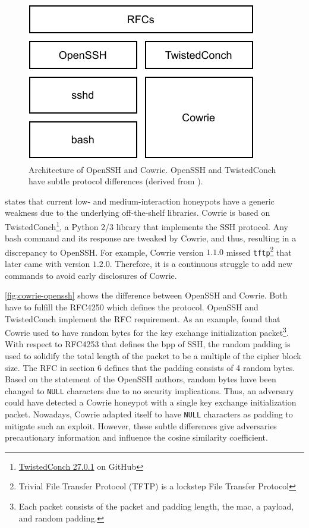 \begin{figure}
    \centering
    \includegraphics{figures/cowrie-openssh.pdf}
    \caption[Architecture of OpenSSH and Cowrie]{
        Architecture of OpenSSH and Cowrie.
        OpenSSH and TwistedConch have subtle protocol differences (derived from \cite{vetterl2020}).
    }
    \label{fig:cowrie-openssh}
\end{figure}

\citet{vetterl2020} states that current low- and medium-interaction honeypots have a generic weakness due to the underlying off-the-shelf libraries.
Cowrie is based on TwistedConch\footnote{\href{https://github.com/twisted/twisted/commit/4e3b22afe1f76b360733b65d6b835b7aaae6deb6}{TwistedConch 27.0.1} on GitHub}, a Python 2/3 library that implements the SSH protocol.
Any bash command and its response are tweaked by Cowrie, and thus, resulting in a discrepancy to OpenSSH.
For example, Cowrie version $1.1.0$ missed \verb|tftp|\footnote{Trivial File Transfer Protocol (TFTP) is a lockstep File Transfer Protocol} that later came with version $1.2.0$.
Therefore, it is a continuous struggle to add new commands to avoid early disclosures of Cowrie.

\autoref{fig:cowrie-openssh} shows the difference between OpenSSH and Cowrie.
Both have to fulfill the RFC4250 \cite{rfc4250} which defines the protocol.
OpenSSH and TwistedConch implement the RFC requirement.
As an example, \citet{vetterl2020} found that Cowrie used to have random bytes for the key exchange initialization packet\footnote{Each packet consists of the packet and padding length, the \ac{mac}, a payload, and random padding.}.
With respect to RFC4253 \cite{rfc4253} that defines the \ac{bpp} of SSH, the random padding is used to solidify the total length of the packet to be a multiple of the cipher block size.
The RFC in section 6 defines that the padding consists of 4 random bytes.
Based on the statement of the OpenSSH authors, random bytes have been changed to \verb|NULL| characters due to no security implications.
Thus, an adversary could have detected a Cowrie honeypot with a single key exchange initialization packet.
Nowadays, Cowrie adapted itself to have \verb|NULL| characters as padding to mitigate such an exploit.
However, these subtle differences give adversaries precautionary information and influence the cosine similarity coefficient.

